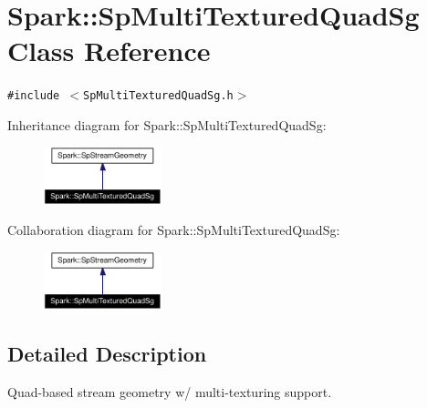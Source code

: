 \section{Spark::Sp\-Multi\-Textured\-Quad\-Sg Class Reference}
\label{classSpark_1_1SpMultiTexturedQuadSg}
{\tt \#include $<$Sp\-Multi\-Textured\-Quad\-Sg.h$>$}

Inheritance diagram for Spark::Sp\-Multi\-Textured\-Quad\-Sg:\begin{figure}[H]
\begin{center}
\leavevmode
\includegraphics[width=97pt]{classSpark_1_1SpMultiTexturedQuadSg__inherit__graph}
\end{center}
\end{figure}
Collaboration diagram for Spark::Sp\-Multi\-Textured\-Quad\-Sg:\begin{figure}[H]
\begin{center}
\leavevmode
\includegraphics[width=97pt]{classSpark_1_1SpMultiTexturedQuadSg__coll__graph}
\end{center}
\end{figure}


\subsection{Detailed Description}
Quad-based stream geometry w/ multi-texturing support. 

